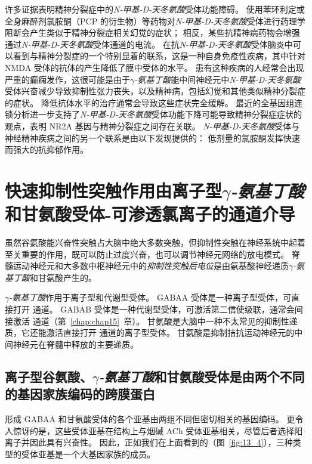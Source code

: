 许多证据表明精神分裂症中的\textit{N-甲基-D-天冬氨酸}受体功能障碍。
使用苯环利定或全身麻醉剂氯胺酮（PCP 的衍生物）等药物对\textit{N-甲基-D-天冬氨酸}受体进行药理学阻断会产生类似于精神分裂症相关幻觉的症状；
相反，某些抗精神病药物会增强通过\textit{N-甲基-D-天冬氨酸}受体通道的电流。
在抗\textit{N-甲基-D-天冬氨酸}受体脑炎中可以看到与精神分裂症的一个特别显着的联系，这是一种自身免疫性疾病，其中针对 NMDA 受体的抗体的产生降低了膜中受体的水平。
患有这种疾病的人经常会出现严重的癫痫发作，这很可能是由于\textit{$\gamma$-氨基丁酸}能中间神经元中\textit{N-甲基-D-天冬氨酸}受体兴奋减少导致抑制性张力丧失，以及精神病，包括幻觉和其他类似精神分裂症的症状。
降低抗体水平的治疗通常会导致这些症状完全缓解。
最近的全基因组连锁分析进一步支持了\textit{N-甲基-D-天冬氨酸}受体功能下降可能导致精神分裂症症状的观点，表明 NR2A 基因与精神分裂症之间存在关联。
\textit{N-甲基-D-天冬氨酸}受体与神经精神疾病之间的另一个联系是由以下发现提供的：
低剂量的氯胺酮发挥快速而强大的抗抑郁作用。



\section{快速抑制性突触作用由离子型\textit{$\gamma$-氨基丁酸}和甘氨酸受体-可渗透氯离子的通道介导}

虽然谷氨酸能兴奋性突触占大脑中绝大多数突触，但抑制性突触在神经系统中起着至关重要的作用，既可以防止过度兴奋，也可以调节神经元网络的放电模式。
脊髓运动神经元和大多数中枢神经元中的\textit{抑制性突触后电位}是由氨基酸神经递质\textit{$\gamma$-氨基丁酸}和甘氨酸产生的。


\textit{$\gamma$-氨基丁酸}作用于离子型和代谢型受体。
GABAA 受体是一种离子型受体，可直接打开  通道。
GABAB 受体是一种代谢型受体，可激活第二信使级联，通常会间接激活  通道（第~\ref{chap:chap15}~章）。 
甘氨酸是大脑中一种不太常见的抑制性递质，它还能激活直接打开  通道的离子型受体。
甘氨酸是抑制拮抗运动神经元的中间神经元在脊髓中释放的主要递质。



\subsection{离子型谷氨酸、\textit{$\gamma$-氨基丁酸}和甘氨酸受体是由两个不同的基因家族编码的跨膜蛋白}

形成 GABAA 和甘氨酸受体的各个亚基由两组不同但密切相关的基因编码。
更令人惊讶的是，这些受体亚基在结构上与烟碱 ACh 受体亚基相关，尽管后者选择阳离子并因此具有兴奋性。 
因此，正如我们在上面看到的（图~\ref{fig:13_4}），三种类型的受体亚基是一个大基因家族的成员。


